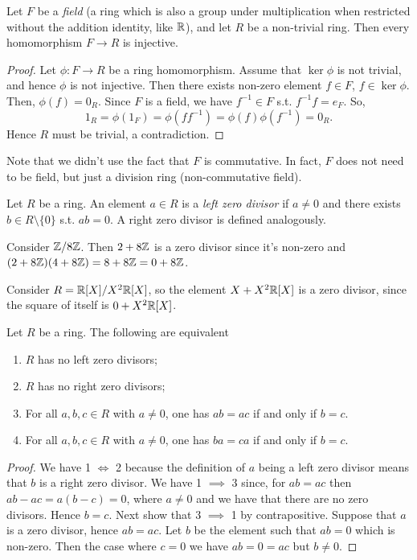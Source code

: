 \begin{theorem}
  Let $F$ be a \emph{field} (a ring which is also a group under multiplication when
  restricted without the addition identity, like $\mathbb R$), and let $R$ be a non-trivial ring. Then every
  homomorphism $F\to R$ is injective.
\end{theorem}
\begin{proof}
  Let $\phi:F\to R$ be a ring homomorphism. Assume that $\ker\phi$ is not trivial, and hence $\phi$ is not injective. Then there exists non-zero element $f\in F$, $f\in\ker \phi$.
  Then, $\phi(f)=0_R$. Since $F$ is a field, we have $f^{-1}\in F$ s.t. $f^{-1}f=e_F$. So,
  $$1_R=\phi(1_F)=\phi(f f^{-1})=\phi(f)\phi(f^{-1})=0_R.$$ Hence $R$ must be trivial, a contradiction.
\end{proof}
\begin{remark}
  Note that we didn't use the fact that $F$ is commutative. In fact, $F$ does not need to
  be field, but just a division ring (non-commutative field).
\end{remark}

\begin{definition}
  Let $R$ be a ring. An element $a\in R$ is a \emph{left zero divisor} if $a\neq 0$ and
  there exists $b\in R\setminus \{0\}$ s.t. $ab=0$. A right zero divisor is defined
  analogously.
\end{definition}

\begin{example}
  Consider $\mathbb Z/8\mathbb Z$. Then $2+8\mathbb Z$ is a zero divisor since it's non-zero and
  $(2+8\mathbb Z)(4+8\mathbb Z)=8+8\mathbb Z=0+8\mathbb Z$. 

  Consider $R=\mathbb R[X]/X^2\mathbb R[X]$, so the element $X+X^2\mathbb R[X]$ is a zero divisor, since
  the square of itself is $0+X^2\mathbb R[X]$.
\end{example}


\begin{theorem}
  Let $R$ be a ring. The following are equivalent
  \begin{enumerate}
    \item $R$ has no left zero divisors;
    \item $R$ has no right zero divisors;
    \item For all $a,b,c\in R$ with $a\neq 0$, one has $ab=ac$ if and only if $b=c$.
    \item For all $a,b,c\in R$ with $a\neq 0$, one has $ba=ca$ if and only if $b=c$.
  \end{enumerate}
  \label{<+label+>}
\end{theorem}
\begin{proof}
  We have 1 $\iff$ 2 because the definition of $a$ being a left zero divisor means that $b$
  is a right zero divisor.  We have 1 $\implies$ 3 since, for $ab=ac$ then $ab-ac=a(b-c)=0$,
  where $a\neq 0$ and we have that there are no zero divisors. Hence $b=c$.
  Next show that 3 $\implies$ 1 by contrapositive. Suppose that $a$ is a zero divisor, hence
  $ab=ac$. Let $b$ be the element such that $ab=0$ which is non-zero. Then the case where
  $c=0$ we have $ab=0=ac$ but $b\neq 0$. 
\end{proof}

